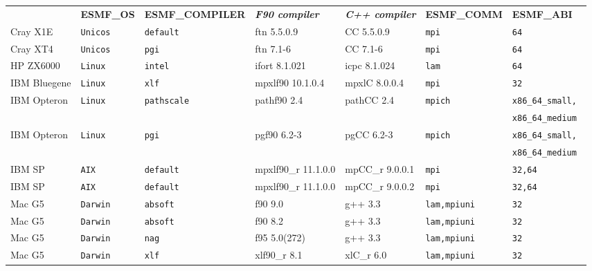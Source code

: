 \begin{tabular}{lllllll}
  &{\bfseries\footnotesize ESMF\_OS} &{\bfseries\footnotesize ESMF\_COMPILER} & {\bfseries\footnotesize\it F90 compiler} & {\bfseries\footnotesize\it C++ compiler} & {\bfseries\footnotesize ESMF\_COMM} & {\bfseries\footnotesize ESMF\_ABI} \\

Cray X1E        &\tt Unicos &\tt default & ftn \footnotesize 5.5.0.9 & CC \footnotesize 5.5.0.9 &\tt mpi &\tt 64 \\
Cray XT4        &\tt Unicos &\tt pgi     & ftn \footnotesize 7.1-6   & CC \footnotesize 7.1-6 &\tt mpi &\tt 64 \\
HP ZX6000       &\tt Linux  &\tt intel   & ifort \footnotesize 8.1.021 & icpc \footnotesize 8.1.024 &\tt lam &\tt 64 \\
IBM Bluegene    &\tt Linux  &\tt xlf     & mpxlf90 \footnotesize 10.1.0.4 & mpxlC \footnotesize 8.0.0.4 &\tt mpi &\tt 32 \\
IBM Opteron     &\tt Linux  &\tt pathscale & pathf90 \footnotesize 2.4 & pathCC \footnotesize 2.4 &\tt mpich &\tt x86\_64\_small, \\
                &           &              &                           &                          &          &\tt x86\_64\_medium \\
IBM Opteron     &\tt Linux  &\tt pgi     & pgf90 \footnotesize 6.2-3 & pgCC \footnotesize 6.2-3 &\tt mpich   &\tt x86\_64\_small, \\
                &           &            &                           &                          &            &\tt x86\_64\_medium \\
IBM SP          &\tt AIX    &\tt default & mpxlf90\_r \footnotesize 11.1.0.0 & mpCC\_r \footnotesize 9.0.0.1 &\tt mpi &\tt 32,64 \\
IBM SP          &\tt AIX    &\tt default & mpxlf90\_r \footnotesize 11.1.0.0 & mpCC\_r \footnotesize 9.0.0.2 &\tt mpi &\tt 32,64 \\
Mac G5          &\tt Darwin &\tt absoft  & f90 \footnotesize 9.0     & g++ \footnotesize 3.3    &\tt lam,mpiuni &\tt 32 \\
Mac G5          &\tt Darwin &\tt absoft  & f90 \footnotesize 8.2     & g++ \footnotesize 3.3    &\tt lam,mpiuni &\tt 32 \\
Mac G5          &\tt Darwin &\tt nag     & f95 \footnotesize 5.0(272)& g++ \footnotesize 3.3    &\tt lam,mpiuni &\tt 32 \\
Mac G5          &\tt Darwin &\tt xlf     & xlf90\_r \footnotesize 8.1& xlC\_r \footnotesize 6.0 &\tt lam,mpiuni &\tt 32 \\

\end{tabular}

